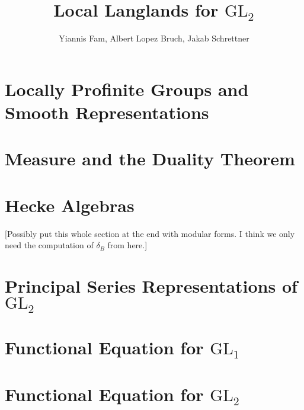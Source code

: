 \documentclass{article}
\title{Local Langlands for $\mathrm{GL}_2$}
\author{Yiannis Fam, Albert Lopez Bruch, Jakab Schrettner}
\newcommand{\GL}{\mathrm{GL}}
\theoremstyle{plain}
\theoremstyle{definition}
\begin{document}
	\maketitle
	\tableofcontents
	\newpage

\section{Locally Profinite Groups and Smooth Representations}

\section{Measure and the Duality Theorem}




\section{Hecke Algebras}
[Possibly put this whole section at the end with modular forms. I think we only need the computation of $\delta_B$ from here.]




%

\section{Principal Series Representations of \texorpdfstring{$\GL_2$}{TEXT}}




\section{Functional Equation for \texorpdfstring{$\GL_1$}{TEXT}}


\section{Functional Equation for \texorpdfstring{$\GL_2$}{TEXT}}


\iffalse
\section{Functional Equation}

\fi
\newpage



\end{document}
